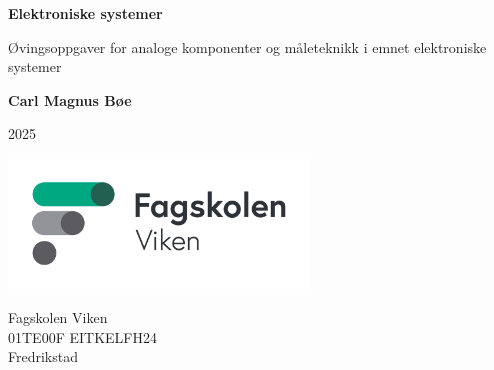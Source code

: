 \begin{titlepage}
    \begin{center}
    \vspace*{1cm}
    \Huge
    \textbf{Elektroniske systemer}
    
    \LARGE
    \vspace{0.5cm}
    Øvingsoppgaver for analoge komponenter og måleteknikk i emnet elektroniske systemer

    \vspace{1.5cm}
    \textbf{Carl Magnus Bøe}
    
    2025

\vfill




    \includegraphics[width=0.6\textwidth]{frontmatter/bilder/r171JViZ6gmf8WXujFQw.jpg}
    \Large
    
    Fagskolen Viken\\
    01TE00F EITKELFH24\\
    Fredrikstad\\

    \end{center}
\end{titlepage}